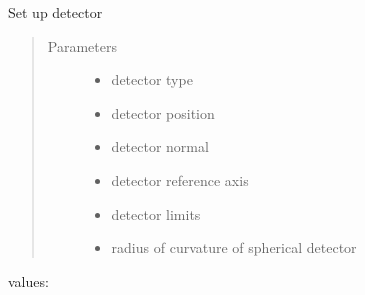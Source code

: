 \documentclass[letterpaper,10pt,english]{sphinxmanual}
\begin{document}
\begin{fulllineitems}
\label{\detokenize{xsrt_functions:xsrt.detector}}
Set up detector
\begin{quote}\begin{description}
\item[{Parameters}] \leavevmode\begin{itemize}
\item {} 
 \textendash{} detector type

\item {} 
 \textendash{} detector position

\item {} 
 \textendash{} detector normal

\item {} 
 \textendash{} detector reference axis

\item {} 
 \textendash{} detector limits

\item {} 
 \textendash{} radius of curvature of spherical detector

\end{itemize}

\end{description}\end{quote}
\begin{description}
\item[{ values:}] \leavevmode
{}

\end{description}

\end{fulllineitems}
\end{document}
